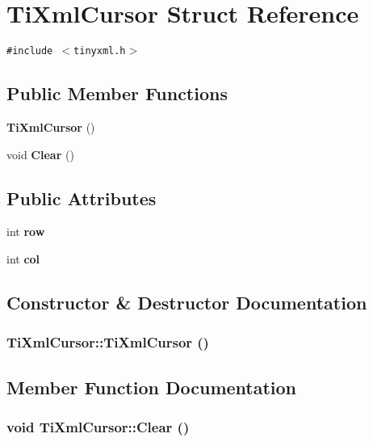 \section{TiXmlCursor Struct Reference}
\label{structTiXmlCursor}
{\tt \#include $<$tinyxml.h$>$}

\subsection*{Public Member Functions}
\begin{CompactItemize}
\item 
{\bf TiXmlCursor} ()
\item 
void {\bf Clear} ()
\end{CompactItemize}
\subsection*{Public Attributes}
\begin{CompactItemize}
\item 
int {\bf row}
\item 
int {\bf col}
\end{CompactItemize}


\subsection{Constructor \& Destructor Documentation}
\subsubsection{\setlength{\rightskip}{0pt plus 5cm}TiXmlCursor::TiXmlCursor ()\hspace{0.3cm}{\tt  [inline]}}\label{structTiXmlCursor_7ad233928a675f0271eb440b150e3ff1}




\subsection{Member Function Documentation}
\subsubsection{\setlength{\rightskip}{0pt plus 5cm}void TiXmlCursor::Clear ()\hspace{0.3cm}{\tt  [inline]}}\label{structTiXmlCursor_1e6fa622b59dafb71b6efe595105dcdd}




